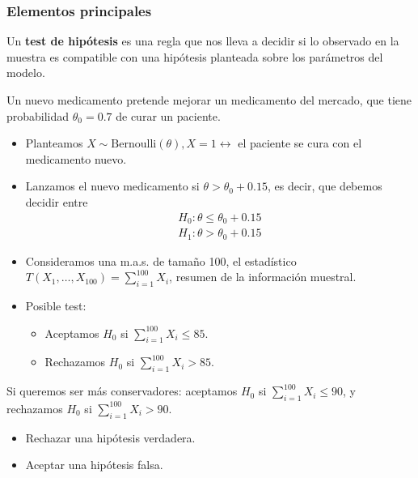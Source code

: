\subsubsection{Elementos principales}
\begin{tcolorbox}[colback=red!5!white, colframe=red!75!black, title=\textbf{Idea básica}]
Un \textbf{test de hipótesis} es una regla que nos lleva a decidir si lo observado en la muestra es compatible con una hipótesis planteada sobre los parámetros del modelo.
\end{tcolorbox}
\begin{tcolorbox}[colback=blue!5!white, colframe=blue!75!black, title=\textbf{Ejemplo}]
Un nuevo medicamento pretende mejorar un medicamento del mercado, que tiene probabilidad $\theta_0=0.7$ de curar un paciente.
\begin{itemize}[label=\textbullet]
    \item Planteamos $X\sim \mathrm{Bernoulli}(\theta),X=1\longleftrightarrow$ el paciente se cura con el medicamento nuevo.
    \item Lanzamos el nuevo medicamento si $\theta>\theta_0+0.15$, es decir, que debemos decidir entre \[
    \begin{array}{l}
        H_0:\theta\le \theta_0+0.15\\
        H_1:\theta>\theta_0+0.15
    \end{array}
    \] 
\item Consideramos una m.a.s. de tamaño 100, el estadístico $T(X_1,\dots,X_{100})=\sum_{i=1}^{100} X_i$, resumen de la información muestral.
\item Posible test:
    \begin{itemize}[label=\textrightarrow]
        \item Aceptamos $H_0$ si $\sum_{i=1}^{100} X_i\le 85$.
        \item Rechazamos $H_0$ si $\sum_{i=1}^{100} X_i>85$.
    \end{itemize}
\end{itemize}
\end{tcolorbox}
Si queremos ser más conservadores: aceptamos $H_0$ si $\sum_{i=1}^{100}X_i\le 90 $, y rechazamos $H_0$ si $\sum_{i=1}^{100} X_i>90$.
\begin{tcolorbox}[colback=blue!5!white, colframe=blue!75!black, title=\textbf{Podemos cometer dos tipos de errores:}]
\begin{itemize}[label=\textbullet]
    \item Rechazar una hipótesis verdadera.
    \item Aceptar una hipótesis falsa.
\end{itemize}
\end{tcolorbox}
